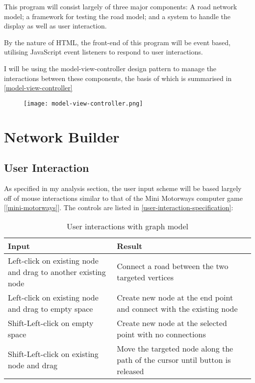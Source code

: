     This program will consist largely of three major components: A road network model; a framework for testing the road model; and a system to handle the display as well as user interaction.

    By the nature of HTML, the front-end of this program will be event based, utilising JavaScript event listeners to respond to user interactions.

    I will be using the model-view-controller design pattern to manage the interactions between these components, the basis of which is summarised in \autoref{model-view-controller}

    \begin{figure}[ht]
        \centering
        \texttt{[image: model-view-controller.png]}
        \caption{}
        \label{model-view-controller}
    \end{figure}

\section{Network Builder}

    \subsection{User Interaction}

    As specified in my analysis section, the user input scheme will be based largely off of mouse interactions similar to that of the Mini Motorways computer game [\autoref{mini-motorways}]. The controls are listed in \autoref{user-interaction-specification}:

    \begin{table}[ht]
        \centering
        \begin{tabular}{|p{}|p{}|}
            \hline
            \textbf{Input} & \textbf{Result}\\
            \hline
            Left-click on existing node and drag to another existing node & Connect a road between the two targeted vertices\\\hline
            Left-click on existing node and drag to empty space & Create new node at the end point and connect with the existing node\\\hline
            Shift-Left-click on empty space & Create new node at the selected point with no connections\\\hline
            Shift-Left-click on existing node and drag & Move the targeted node along the path of the cursor until button is released\\\hline
        \end{tabular}
        \caption{User interactions with graph model}
        \label{user-interaction-specification}
    \end{table}


